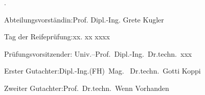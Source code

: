 \begin{titlepage}
	{\color{white}.}
	\bigskip
	\vspace{14cm}
	\noindent%

	Abteilungsvorst\"andin:\hfill Prof. Dipl.-Ing. Grete Kugler\\
	\bigskip
	\bigskip

	Tag der Reifeprüfung:\hfill xx. xx xxxx\\
	\bigskip
	\bigskip

	Prüfungsvorsitzender:\hfill
	Univ.--Prof.~Dipl.-Ing.~Dr.techn.~xxx\\
	\smallskip

	Erster Gutachter:\hfill Dipl.-Ing.(FH)\ Mag. \ Dr.techn.\ Gotti Koppi\\
	\smallskip

	Zweiter Gutachter:\hfill 	Prof.\ Dr.techn.\ Wenn Vorhanden\\
		\smallskip
\end{titlepage}
